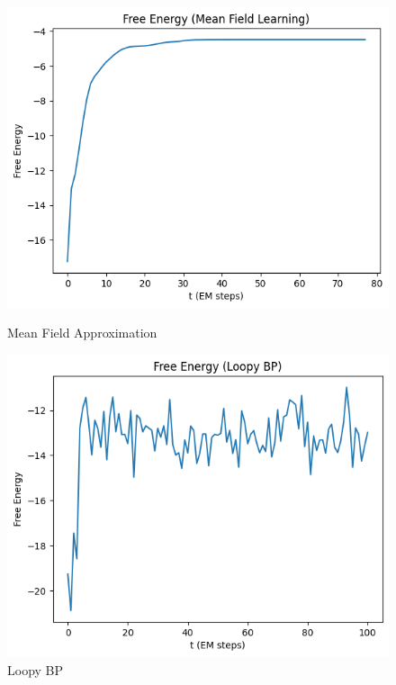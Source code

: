 \documentclass[12pt]{article}
\begin{document}
\newpage

\begin{figure}[h]
\centering
\begin{minipage}{.5\textwidth}
  \centering
\includegraphics[scale=0.4]{outputs/q3/f-free-energy}
\caption{Mean Field Approximation}
\label{fig:3g-free-energy-diff-sigma}
\end{minipage}%
\begin{minipage}{.5\textwidth}
  \centering
\includegraphics[scale=0.4]{outputs/q6/all-free-energy}
\caption{Loopy BP}
\label{fig:3g-free-energy-diff-sigma}
\end{minipage}
\end{figure}
\end{document}
